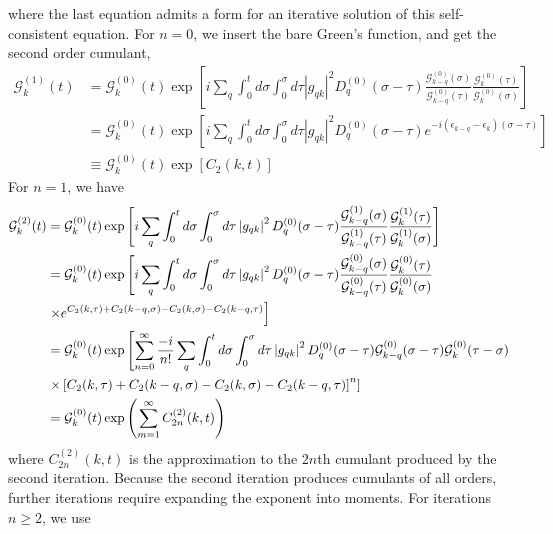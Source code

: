 where the last equation admits a form for an iterative solution of this self-consistent equation. For $n=0$, we insert the bare Green's function, and get the second order cumulant,
\begin{align}
    \mathcal{G}_k^{(1)}(t)&=\mathcal{G}_k^{(0)}(t) \exp \left[i \sum_q \int_0^t d \sigma \int_0^\sigma d \tau\left|g_{q k}\right|^2 D_q^{(0)}(\sigma-\tau) \frac{\mathcal{G}_{k-q}^{(0)}(\sigma)}{\mathcal{G}_{k-q}^{(0)}(\tau)} \frac{\mathcal{G}_k^{(0)}(\tau)}{\mathcal{G}_k^{(0)}(\sigma)}\right] \\
&=\mathcal{G}_k^{(0)}(t) \exp \left[i \sum_q \int_0^t d \sigma \int_0^\sigma d \tau\left|g_{q k}\right|^2 D_q^{(0)}(\sigma-\tau) e^{-i\left(\epsilon_{k-q}-\epsilon_k\right)(\sigma-\tau)}\right] \\
&\equiv\mathcal{G}_k^{(0)}(t) \exp \left[C_2(k, t)\right]
\end{align}
For $n=1$, we have
\begin{align}
    \mathcal{G}_k^{(2)}(t)&=\mathcal{G}_k^{(0)}(t) \exp \left[i \sum_q \int_0^t d \sigma \int_0^\sigma d \tau\left|g_{q k}\right|^2 D_q^{(0)}(\sigma-\tau) \frac{\mathcal{G}_{k-q}^{(1)}(\sigma)}{\mathcal{G}_{k-q}^{(1)}(\tau)} \frac{\mathcal{G}_k^{(1)}(\tau)}{\mathcal{G}_k^{(1)}(\sigma)}\right] \label{iterative_step} \\
&=\mathcal{G}_k^{(0)}(t) \exp \left[i \sum_q \int_0^t d \sigma \int_0^\sigma d \tau\left|g_{q k}\right|^2 D_q^{(0)}(\sigma-\tau) \frac{\mathcal{G}_{k-q}^{(0)}(\sigma)}{\mathcal{G}_{k-q}^{(0)}(\tau)} \frac{\mathcal{G}_k^{(0)}(\tau)}{\mathcal{G}_k^{(0)}(\sigma)}\right. \notag \\
&\left.\times e^{C_2(k, \tau)+C_2(k-q, \sigma)-C_2(k, \sigma)-C_2(k-q, \tau)}\right] \\
&=\mathcal{G}_k^{(0)}(t) \exp \left[\sum_{n=0}^{\infty} \frac{-i}{n!} \sum_q \int_0^t d \sigma \int_0^\sigma d \tau \left|g_{q k}\right|^2 D_q^{(0)}(\sigma-\tau) \mathcal{G}_{k-q}^{(0)}(\sigma-\tau) \mathcal{G}_k^{(0)}(\tau-\sigma)\right. \label{moment_expansion}\\
& \left.\times\left[C_2(k, \tau)+C_2(k-q, \sigma)-C_2(k, \sigma)-C_2(k-q, \tau)\right]^n\right] \notag \\
&=\mathcal{G}_k^{(0)}(t) \exp \left(\sum_{m=1}^{\infty} C_{2n}^{(2)}(k, t)\right)
\end{align}
where $C_{2n}^{(2)}(k, t)$ is the approximation to the $2n$th cumulant produced by the second iteration.
Because the second iteration produces cumulants of all orders, further iterations require expanding the exponent into moments. For iterations $n \geq 2$, we use
